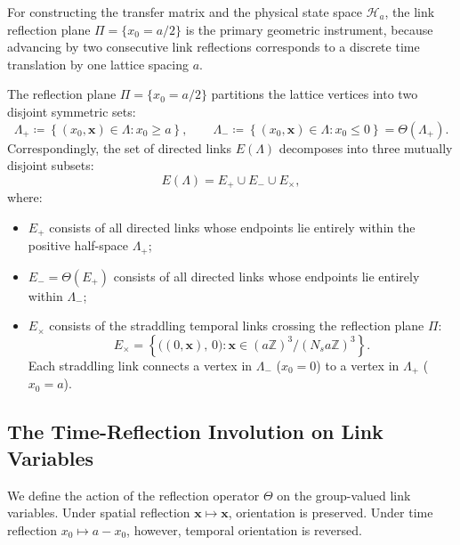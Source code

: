 For constructing the transfer matrix and the physical state space $\mathcal{H}_a$, the link reflection plane $\Pi = \{x_0 = a/2\}$ is the primary geometric instrument, because advancing by two consecutive link reflections corresponds to a discrete time translation by one lattice spacing $a$.

The reflection plane $\Pi = \{x_0 = a/2\}$ partitions the lattice vertices into two disjoint symmetric sets:
\begin{equation}
\Lambda_+ \coloneqq \left\{ (x_0, \mathbf{x}) \in \Lambda : x_0 \ge a \right\}, \qquad \Lambda_- \coloneqq \left\{ (x_0, \mathbf{x}) \in \Lambda : x_0 \le 0 \right\} = \Theta(\Lambda_+).
\end{equation}
Correspondingly, the set of directed links $E(\Lambda)$ decomposes into three mutually disjoint subsets:
\begin{equation}
\label{eq:link_decomposition_ch2}
E(\Lambda) = E_+ \cup E_- \cup E_\times,
\end{equation}
where:
\begin{itemize}
    \item $E_+$ consists of all directed links whose endpoints lie entirely within the positive half-space $\Lambda_+$;
    \item $E_- = \Theta(E_+)$ consists of all directed links whose endpoints lie entirely within $\Lambda_-$;
    \item $E_\times$ consists of the straddling temporal links crossing the reflection plane $\Pi$:
    \begin{equation}
    E_\times = \left\{ \bigl( (0, \mathbf{x}), \, 0 \bigr) : \mathbf{x} \in (a \mathbb{Z})^3 / (N_s a \mathbb{Z})^3 \right\}.
    \end{equation}
    Each straddling link connects a vertex in $\Lambda_-$ ($x_0 = 0$) to a vertex in $\Lambda_+$ ($x_0 = a$).
\end{itemize}

\subsection{The Time-Reflection Involution on Link Variables}
\label{subsec:time_reflection_links}
We define the action of the reflection operator $\Theta$ on the group-valued link variables. Under spatial reflection $\mathbf{x} \mapsto \mathbf{x}$, orientation is preserved. Under time reflection $x_0 \mapsto a - x_0$, however, temporal orientation is reversed.

